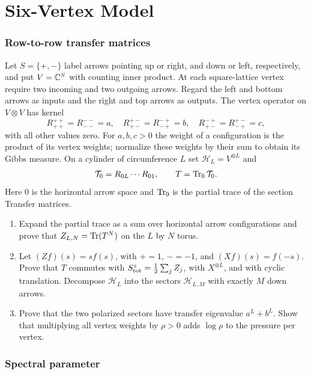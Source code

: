 \part{Six-Vertex Model}

\section{Row-to-row transfer matrices}

\begin{exercise}
Let $S=\{+,-\}$ label arrows pointing up or right, and down or left,
respectively, and put $V=\mathbb C^S$ with counting inner product. At each
square-lattice vertex require two incoming and two outgoing arrows.
Regard the left and bottom arrows as inputs and the right and top arrows
as outputs. The vertex operator on $V\otimes V$ has kernel
\[
 R^{++}_{++}=R^{--}_{--}=a,\quad
 R^{+-}_{+-}=R^{-+}_{-+}=b,\quad
 R^{-+}_{+-}=R^{+-}_{-+}=c,
\]
with all other values zero. For $a,b,c>0$ the weight of a configuration
is the product of its vertex weights; normalize these weights by their
sum to obtain its Gibbs measure. On a cylinder of circumference $L$ set
$\mathcal H_L=V^{\otimes L}$ and
\[
 \mathcal T_0=R_{0L}\cdots R_{01},\qquad
 T=\operatorname{Tr}_0\mathcal T_0.
\]
Here $0$ is the horizontal arrow space and $\operatorname{Tr}_0$ is the partial trace
of the section Transfer matrices.
\begin{enumerate}[label=(\alph*)]
\item Expand the partial trace as a sum over horizontal arrow
configurations and prove that $Z_{L,N}=\operatorname{Tr}(T^N)$ on the $L$ by $N$ torus.
\item Let $(Zf)(s)=s f(s)$, with $+=1$, $-=-1$, and
$(Xf)(s)=f(-s)$. Prove that $T$ commutes with
$S^z_{\rm tot}=\frac12\sum_j Z_j$, with $X^{\otimes L}$, and with
cyclic translation. Decompose $\mathcal H_L$ into the sectors
$\mathcal H_{L,M}$ with exactly $M$ down arrows.
\item Prove that the two polarized sectors have transfer eigenvalue
$a^L+b^L$. Show that multiplying all vertex weights by $\rho>0$
adds $\log\rho$ to the pressure per vertex.
\end{enumerate}
\end{exercise}

\section{Spectral parameter}

